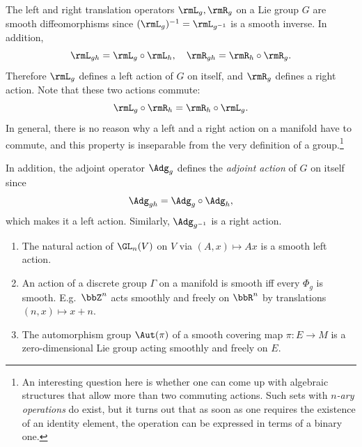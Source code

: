 \begin{example}
    The left and right translation operators $\rmL_g,\rmR_g$ on a Lie group $G$ are smooth diffeomorphisms since $(\rmL_g)^{-1}=\rmL_{g^{-1}}$ is a smooth inverse. In addition,
    \[\rmL_{gh}=\rmL_g\circ \rmL_h,\quad \rmR_{gh}=\rmR_h\circ \rmR_g.\]
    Therefore $\rmL_g$ defines a left action of $G$ on itself, and $\rmR_g$ defines a right action. Note that these two actions commute: 
    \[\rmL_g\circ \rmR_h=\rmR_h\circ \rmL_g.\]
    In general, there is no reason why a left and a right action on a manifold have to commute, and this property is inseparable from the very definition of a group.\footnote{An interesting question here is whether one can come up with algebraic structures that allow more than two commuting actions. Such sets with \emph{$n$-ary operations} do exist, but it turns out that as soon as one requires the existence of an identity element, the operation can be expressed in terms of a binary one.}

    In addition, the adjoint operator $\Adg_g$ defines the \emph{adjoint action} of $G$ on itself since 
    \[\Adg_{gh}=\Adg_g\circ \Adg_h,\]
    which makes it a left action. Similarly, $\Adg_{g^{-1}}$ is a right action.
\end{example}

\begin{example}
    \begin{enumerate}[label=(\alph*)]
        \item The natural action of $\GL_n(V)$ on $V$ via $(A,x)\mapsto Ax$ is a smooth left action.
        \item An action of a discrete group $\Gamma$ on a manifold is smooth iff every $\Phi_g$ is smooth. E.g.~$\bbZ^n$ acts smoothly and freely on $\bbR^n$ by translations $(n,x)\mapsto x+n$.
        \item The automorphism group $\Aut(\pi)$ of a smooth covering map $\pi:E\to M$ is a zero-dimensional Lie group acting smoothly and freely on $E$.
    \end{enumerate}
\end{example}

